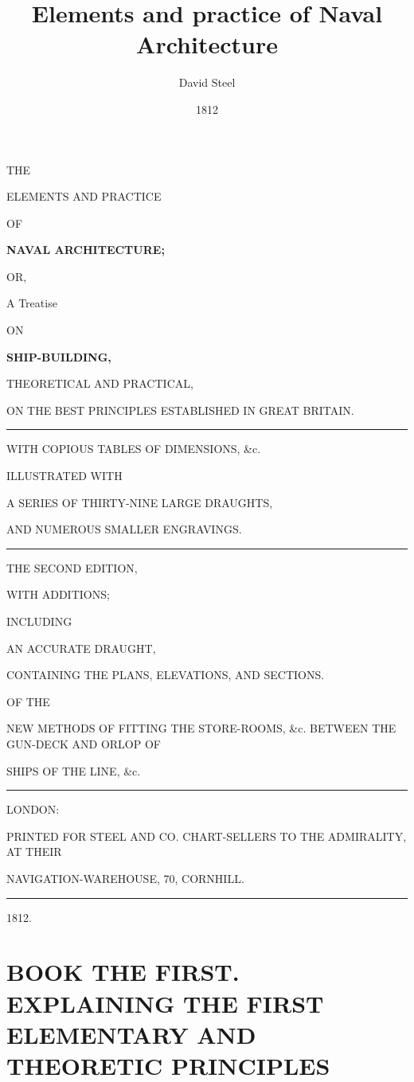 \documentclass[12pt,twoside,a4paper]{book}
\begin{document}
	
\title{Elements and practice of Naval Architecture}
\author{David Steel}
\date{1812}

\begin{titlepage}
\doublespacing
\begin{center}

\footnotesize THE

\LARGE ELEMENTS AND PRACTICE

\tiny OF

\Huge \textbf{NAVAL ARCHITECTURE;}

\tiny OR,

\LARGE A Treatise

\tiny ON

\huge \textbf{SHIP-BUILDING,}

\small THEORETICAL AND PRACTICAL,

\large ON THE BEST PRINCIPLES ESTABLISHED IN GREAT BRITAIN.

\rule{4cm}{2pt}

\normalsize WITH COPIOUS TABLES OF DIMENSIONS, \&c.

\small ILLUSTRATED WITH

\large A SERIES OF THIRTY-NINE LARGE DRAUGHTS,

\small AND NUMEROUS SMALLER ENGRAVINGS.

\rule{4cm}{2pt}

\small THE SECOND EDITION,

\footnotesize WITH ADDITIONS;

\tiny INCLUDING 

\large AN ACCURATE DRAUGHT,

\footnotesize CONTAINING THE PLANS, ELEVATIONS, AND SECTIONS.

\tiny OF THE

\singlespacing
\small NEW METHODS OF FITTING THE STORE-ROOMS, \&c. BETWEEN THE GUN-DECK AND ORLOP OF 

SHIPS OF THE LINE, \&c.

\rule{8cm}{1pt}

\footnotesize LONDON:

\scriptsize PRINTED FOR STEEL AND CO. CHART-SELLERS TO THE ADMIRALITY, AT THEIR

\scriptsize NAVIGATION-WAREHOUSE, 70, CORNHILL.

\rule{3cm}{1pt}

\large 1812.
	\end{center}
\end{titlepage}
\restoregeometry

\part{BOOK THE FIRST. \\
\footnotesize EXPLAINING THE FIRST ELEMENTARY AND THEORETIC PRINCIPLES}
\setlength{\parindent}{0pt}

\end{document}
